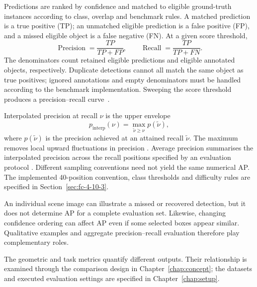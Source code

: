 Predictions are ranked by confidence and matched to eligible ground-truth
instances according to class, overlap and benchmark rules. A matched
prediction is a true positive (TP); an unmatched eligible prediction is a
false positive (FP), and a missed eligible object is a false negative (FN).
At a given score threshold,
\begin{equation}
 \operatorname{Precision}=\frac{TP}{TP+FP},
 \qquad
 \operatorname{Recall}=\frac{TP}{TP+FN}.
 \label{eq:precision_recall}
\end{equation}
The denominators count retained eligible predictions and eligible annotated
objects, respectively. Duplicate detections cannot all match the same
object as true positives; ignored annotations and empty denominators must
be handled according to the benchmark implementation. Sweeping the score
threshold produces a precision--recall curve~\cite{everingham2010voc}.

Interpolated precision at recall $\nu$ is the upper envelope
\begin{equation}
 p_\mathrm{interp}(\nu)=\max_{\tilde\nu\ge\nu}p(\tilde\nu),
 \label{eq:interp_precision}
\end{equation}
where $p(\tilde\nu)$ is the precision achieved at an attained recall
$\tilde\nu$. The maximum removes local upward fluctuations in precision
\cite{everingham2010voc}. Average precision summarises the interpolated precision across the
recall positions specified by an evaluation protocol
\cite{everingham2010voc,simonelli2019disentangling}. Different sampling
conventions need not yield the same numerical AP. The implemented
40-position convention, class thresholds and difficulty rules are
specified in Section~\ref{sec:fc-4-10-3}.

An individual scene image can illustrate a missed or recovered detection,
but it does not determine AP for a complete evaluation set. Likewise,
changing confidence ordering can affect AP even if some selected boxes
appear similar. Qualitative examples and aggregate precision--recall
evaluation therefore play complementary roles.

The geometric and task metrics quantify different outputs. Their
relationship is examined through the comparison design in
Chapter~\ref{chap:concept}; the datasets and executed evaluation settings
are specified in Chapter~\ref{chap:setup}.
\FloatBarrier
